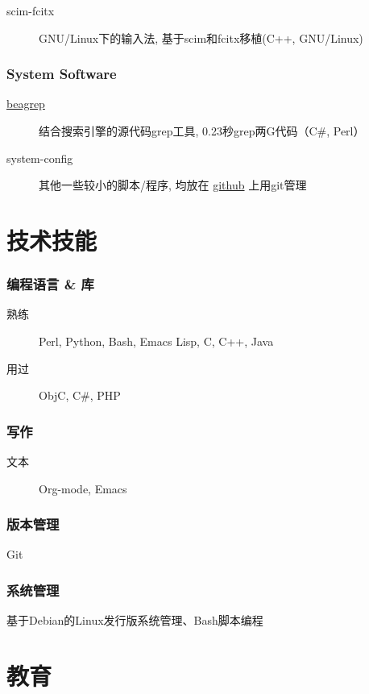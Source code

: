 \documentclass[11pt,dvipdfmx,CJKbookmarks]{article}
\begin{document}
\begin{CJK*}{UTF8}{simsun}
\begin{description}
\item[{scim-fcitx}] GNU/Linux下的输入法, 基于scim和fcitx移植(C++,
GNU/Linux)
\end{description}

\subsubsection{System Software}
\label{sec-2-0-4}
\begin{description}
\item[{\href{https://github.com/baohaojun/beagrep}{beagrep}}] 结合搜索引擎的源代码grep工具, 0.23秒grep两G代码（C\#,
Perl）

\item[{system-config}] 其他一些较小的脚本/程序, 均放在 \href{https://github.com/baohaojun}{github} 上用git管理
\end{description}


\section{技术技能}
\label{sec-3}

\subsubsection{编程语言 \& 库}
\label{sec-3-0-1}
\begin{description}
\item[{熟练}] Perl, Python, Bash, Emacs Lisp, C, C++, Java

\item[{用过}] ObjC, C\#, PHP
\end{description}
\subsubsection{写作}
\label{sec-3-0-2}
\begin{description}
\item[{文本}] Org-mode, Emacs
\end{description}
\subsubsection{版本管理}
\label{sec-3-0-3}
Git
\subsubsection{系统管理}
\label{sec-3-0-4}
基于Debian的Linux发行版系统管理、Bash脚本编程

\section{教育}
\label{sec-4}


\end{CJK*}
\end{document}
